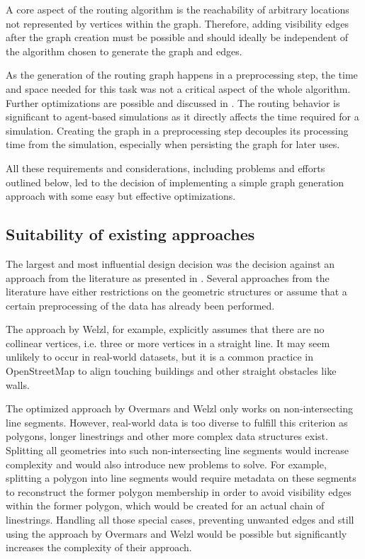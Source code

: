 		A core aspect of the routing algorithm is the reachability of arbitrary locations not represented by vertices within the graph.
		Therefore, adding visibility edges after the graph creation must be possible and should ideally be independent of the algorithm chosen to generate the graph and edges.
		
		As the generation of the routing graph happens in a preprocessing step, the time and space needed for this task was not a critical aspect of the whole algorithm.
		Further optimizations are possible and discussed in .
		The routing behavior is significant to agent-based simulations as it directly affects the time required for a simulation.
		Creating the graph in a preprocessing step decouples its processing time from the simulation, especially when persisting the graph for later uses.
		
		All these requirements and considerations, including problems and efforts outlined below, led to the decision of implementing a simple graph generation approach with some easy but effective optimizations.
	
	\subsection{Suitability of existing approaches}
	\label{subsec:suitablilty-edge-creation-approaches}

		The largest and most influential design decision was the decision against an approach from the literature as presented in .
		Several approaches from the literature have either restrictions on the geometric structures or assume that a certain preprocessing of the data has already been performed.
		
		The approach by Welzl\cite{welzl-visibility-graph}, for example, explicitly assumes that there are no collinear vertices, i.e. three or more vertices in a straight line.
		It may seem unlikely to occur in real-world datasets, but it is a common practice in OpenStreetMap to align touching buildings and other straight obstacles like walls.
		
		The optimized approach by Overmars and Welzl\cite{overmars-weizl-visibility-graph} only works on non-intersecting line segments.
		However, real-world data is too diverse to fulfill this criterion as polygons, longer linestrings and other more complex data structures exist.
		Splitting all geometries into such non-intersecting line segments would increase complexity and would also introduce new problems to solve.
		For example, splitting a polygon into line segments would require metadata on these segments to reconstruct the former polygon membership in order to avoid visibility edges within the former polygon, which would be created for an actual chain of linestrings.
		Handling all those special cases, preventing unwanted edges and still using the approach by Overmars and Welzl would be possible but significantly increases the complexity of their approach.
		
